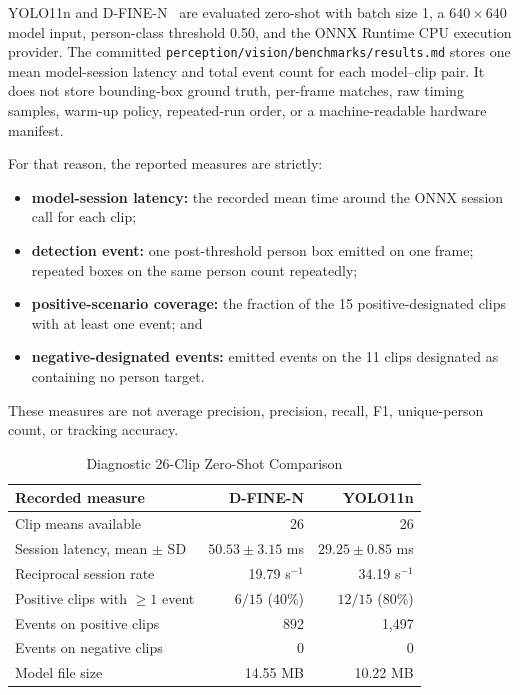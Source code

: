 YOLO11n and D-FINE-N~\cite{peng2024dfine} are evaluated zero-shot with batch size 1, a $640\times640$ model input, person-class threshold 0.50, and the ONNX Runtime CPU execution provider. The committed \texttt{perception/vision/benchmarks/results.md} stores one mean model-session latency and total event count for each model--clip pair. It does not store bounding-box ground truth, per-frame matches, raw timing samples, warm-up policy, repeated-run order, or a machine-readable hardware manifest.

For that reason, the reported measures are strictly:
\begin{itemize}
    \item \textbf{model-session latency:} the recorded mean time around the ONNX session call for each clip;
    \item \textbf{detection event:} one post-threshold person box emitted on one frame; repeated boxes on the same person count repeatedly;
    \item \textbf{positive-scenario coverage:} the fraction of the 15 positive-designated clips with at least one event; and
    \item \textbf{negative-designated events:} emitted events on the 11 clips designated as containing no person target.
\end{itemize}
These measures are not average precision, precision, recall, F1, unique-person count, or tracking accuracy.

\begin{table}[t]
\caption{Diagnostic 26-Clip Zero-Shot Comparison}
\label{tab:cv_benchmark_summary}
\centering
\footnotesize
\begin{tabularx}{\columnwidth}{@{}Xrr@{}}
\toprule
\textbf{Recorded measure} & \textbf{D-FINE-N} & \textbf{YOLO11n} \\
\midrule
Clip means available & 26 & 26 \\
Session latency, mean $\pm$ SD & $50.53\pm3.15$ ms & $29.25\pm0.85$ ms \\
Reciprocal session rate & 19.79 s$^{-1}$ & 34.19 s$^{-1}$ \\
Positive clips with $\ge1$ event & $6/15$ (40\%) & $12/15$ (80\%) \\
Events on positive clips & 892 & 1,497 \\
Events on negative clips & 0 & 0 \\
Model file size & 14.55 MB & 10.22 MB \\
\bottomrule
\end{tabularx}
\end{table}

